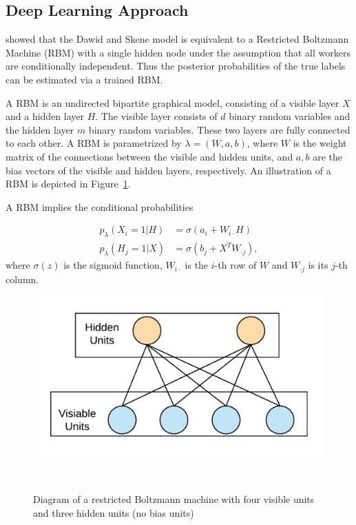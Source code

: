 \documentclass{article}
\begin{document}
\subsection{Deep Learning Approach}
\cite{Shaham2016-nh} showed that the Dawid and Skene model is
equivalent to a Restricted Boltzmann Machine (RBM) with a single
hidden node under the assumption that all workers are conditionally
independent. Thus the posterior probabilities of the true labels can
be estimated via a trained RBM.

A RBM is an undirected bipartite graphical model, consisting of a
visible layer $X$ and a hidden layer $H$. The visible layer consists
of $d$ binary random variables and the hidden layer $m$ binary random
variables. These two layers are fully connected to each other. A RBM
is parametrized by $\lambda = (W, a, b)$, where $W$ is the weight
matrix of the connections between the visible and hidden units, and
$a,b$ are the bias vectors of the visible and hidden layers,
respectively. An illustration of a RBM is depicted in Figure~\ref{fg:rbm_model}.

A RBM implies the conditional probabilities

\begin{align*}
p_{\lambda}(X_i=1|H) &= \sigma (a_i+W_{i\cdot}H) \\
p_{\lambda}(H_j=1|X) &= \sigma (b_j+X^{T}W_{\cdot j}),
\end{align*}
where $\sigma (z)$ is the sigmoid function, $W_{i\cdot}$ is the $i$-th
row of $W$ and $W_{\cdot j}$ is its $j$-th column.
\begin{figure}[h]
  \centering
  \includegraphics[width=0.95\columnwidth]{rbm.png}
  \caption{Diagram of a restricted Boltzmann machine with four visible
  units and three hidden units (no bias units)} ~\label{fg:rbm_model}
\end{figure}
\end{document}

